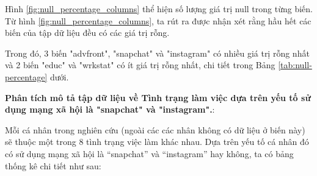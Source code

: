 Hình \ref{fig:null_percentage_columns} thể hiện số lượng giá trị null trong từng biến. Từ hình \ref{fig:null_percentage_columns}, ta rút ra được nhận xét rằng hầu hết các biến của tập dữ liệu đều có các giá trị rỗng.

Trong đó, 3 biến "advfront", "snapchat" và "instagram" có nhiều giá trị rỗng nhất và 2 biến "educ" và "wrkstat" có ít giá trị rỗng nhất, chi tiết trong Bảng \ref{tab:null-percentage} dưới.

\begin{table}[h!]
    \centering
    \caption{Tỷ lệ giá trị rỗng trong từng cột}
    \label{tab:null-percentage}
\end{table}

\textbf{Phân tích mô tả tập dữ liệu về Tình trạng làm việc dựa trên yếu tố sử dụng mạng xã hội là "snapchat" và "instagram".}:

Mỗi cá nhân trong nghiên cứu (ngoài các các nhân không có dữ liệu ở biến này) sẽ thuộc một trong 8 tình trạng việc làm khác nhau.  Dựa trên yếu tố cá nhân đó có sử dụng mạng xã hội là “snapchat” và “instagram” hay không, ta có bảng thống kê chi tiết như sau:

